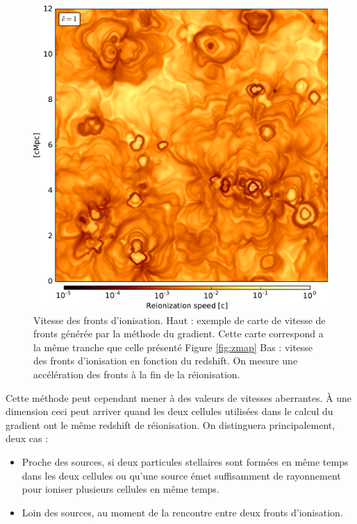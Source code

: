 \begin{figure}
        \includegraphics[width=.95\linewidth]{img/04_mapreio/map_v_c1.pdf} 
        
        \caption[Vitesse des fronts d'ionisation]{Vitesse des fronts d'ionisation.
        Haut : exemple de carte de vitesse de fronts générée par la méthode du gradient.
		Cette carte correspond a la même tranche que celle présenté Figure \ref{fig:zmap}
		Bas : vitesse des fronts d'ionisation en fonction du redshift.
        On mesure une accélération des fronts à la fin de la réionisation.
        }
 		\label{fig:vmap}
\end{figure}

Cette méthode peut cependant mener à des valeurs de vitesses aberrantes.
À une dimension ceci peut arriver quand les deux cellules utilisées dans le calcul du gradient ont le même redshift de réionisation.
On distinguera principalement, deux cas : 
\begin{itemize}
\item Proche des sources, si deux particules stellaires sont formées en même temps dans les deux cellules ou qu'une source émet suffisamment de rayonnement pour ioniser plusieurs cellules en même temps.
\item Loin des sources, au moment de la rencontre entre deux fronts d'ionisation.
\end{itemize}

